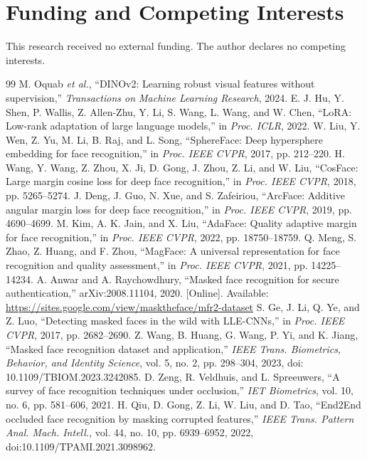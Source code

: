 \documentclass[10pt,lettersize,journal]{IEEEtran}
\begin{document}
\section*{Funding and Competing Interests}
This research received no external funding. The author declares no competing interests.\par
{}
\begin{thebibliography}{99}
 M. Oquab \textit{et al.}, ``DINOv2: Learning robust visual features without supervision,'' \textit{Transactions on Machine Learning Research}, 2024.
 E. J. Hu, Y. Shen, P. Wallis, Z. Allen-Zhu, Y. Li, S. Wang, L. Wang, and W. Chen, ``LoRA: Low-rank adaptation of large language models,'' in \textit{Proc. ICLR}, 2022.
 W. Liu, Y. Wen, Z. Yu, M. Li, B. Raj, and L. Song, ``SphereFace: Deep hypersphere embedding for face recognition,'' in \textit{Proc. IEEE CVPR}, 2017, pp. 212--220.
 H. Wang, Y. Wang, Z. Zhou, X. Ji, D. Gong, J. Zhou, Z. Li, and W. Liu, ``CosFace: Large margin cosine loss for deep face recognition,'' in \textit{Proc. IEEE CVPR}, 2018, pp. 5265--5274.
 J. Deng, J. Guo, N. Xue, and S. Zafeiriou, ``ArcFace: Additive angular margin loss for deep face recognition,'' in \textit{Proc. IEEE CVPR}, 2019, pp. 4690--4699.
 M. Kim, A. K. Jain, and X. Liu, ``AdaFace: Quality adaptive margin for face recognition,'' in \textit{Proc. IEEE CVPR}, 2022, pp. 18750--18759.
 Q. Meng, S. Zhao, Z. Huang, and F. Zhou, ``MagFace: A universal representation for face recognition and quality assessment,'' in \textit{Proc. IEEE CVPR}, 2021, pp. 14225--14234.
 A. Anwar and A. Raychowdhury, ``Masked face recognition for secure authentication,'' arXiv:2008.11104, 2020. [Online]. Available: \url{https://sites.google.com/view/masktheface/mfr2-dataset}
 S. Ge, J. Li, Q. Ye, and Z. Luo, ``Detecting masked faces in the wild with LLE-CNNs,'' in \textit{Proc. IEEE CVPR}, 2017, pp. 2682--2690.
 Z. Wang, B. Huang, G. Wang, P. Yi, and K. Jiang, ``Masked face recognition dataset and application,'' \textit{IEEE Trans. Biometrics, Behavior, and Identity Science}, vol. 5, no. 2, pp. 298--304, 2023, doi: 10.1109/TBIOM.2023.3242085.
 D. Zeng, R. Veldhuis, and L. Spreeuwers, ``A survey of face recognition techniques under occlusion,'' \textit{IET Biometrics}, vol. 10, no. 6, pp. 581--606, 2021.
 H. Qiu, D. Gong, Z. Li, W. Liu, and D. Tao, ``End2End occluded face recognition by masking corrupted features,'' \textit{IEEE Trans. Pattern Anal. Mach. Intell.}, vol. 44, no. 10, pp. 6939--6952, 2022, doi:10.1109/TPAMI.2021.3098962.

\end{thebibliography}
\end{document}
